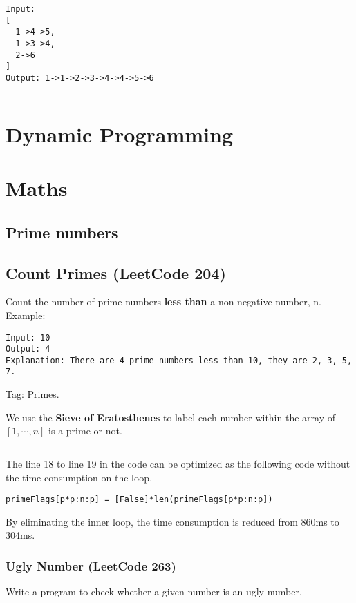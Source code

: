 \documentclass[11pt]{article}
\begin{document}
\begin{verbatim}
Input:
[
  1->4->5,
  1->3->4,
  2->6
]
Output: 1->1->2->3->4->4->5->6
\end{verbatim}


\inputminted[breaklines=true,frame=leftline, linenos=true]{python}{src/mergeKSortedLists.py}

\section{Dynamic Programming}

\section{Maths}
\subsection{Prime numbers}
\subsection{Count Primes (LeetCode 204)}
Count the number of prime numbers \textbf{less than} a non-negative number, n.
Example:
\begin{verbatim}
Input: 10
Output: 4
Explanation: There are 4 prime numbers less than 10, they are 2, 3, 5, 7.
\end{verbatim}

Tag: Primes.

We use the \textbf{Sieve of Eratosthenes} to label each number within the array of $[1, \cdots, n]$ is a prime or not.
\inputminted[breaklines=true,frame=leftline, linenos=true]{python}{src/countPrimes.py}

The line 18 to line 19 in the code can be optimized as the following code without the time consumption on the loop. 
\begin{verbatim}
primeFlags[p*p:n:p] = [False]*len(primeFlags[p*p:n:p])	
\end{verbatim}

By eliminating the inner loop, the time consumption is reduced from 860ms to 304ms. 

\subsubsection{Ugly Number (LeetCode 263)}
Write a program to check whether a given number is an ugly number.
\end{document}
